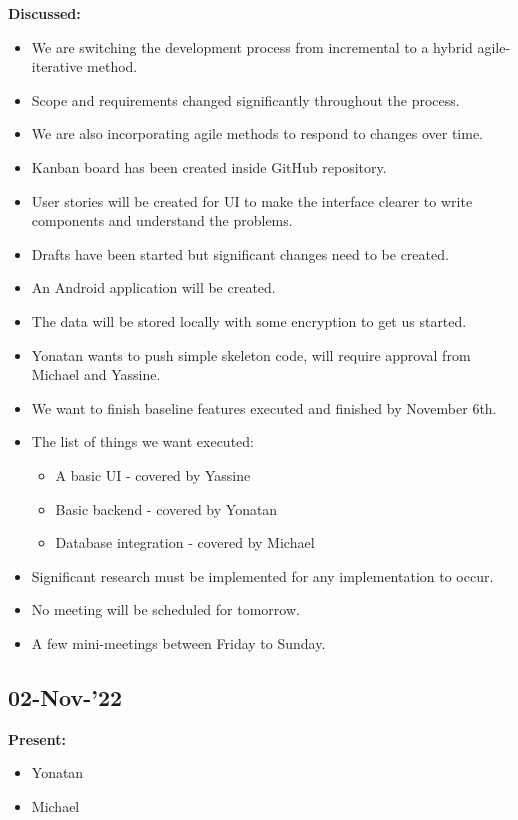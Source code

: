 \documentclass[11pt]{article}
\begin{document}
    \textbf{Discussed:}
    \begin{itemize}
        \item We are switching the development process from incremental to a hybrid agile-iterative method.
        \item Scope and requirements changed significantly throughout the process.
        \item We are also incorporating agile methods to respond to changes over time.
        \item Kanban board has been created inside GitHub repository.
        \item User stories will be created for UI to make the interface clearer to write components and understand the problems.
        \item Drafts have been started but significant changes need to be created.
        \item An Android application will be created.
        \item The data will be stored locally with some encryption to get us started.
        \item Yonatan wants to push simple skeleton code, will require approval from Michael and Yassine.
        \item We want to finish baseline features executed and finished by November 6th.
        \item The list of things we want executed:
        \begin{itemize}
            \item A basic UI - covered by Yassine
            \item Basic backend - covered by Yonatan
            \item Database integration - covered by Michael
        \end{itemize}
        \item Significant research must be implemented for any implementation to occur.
        \item No meeting will be scheduled for tomorrow.
        \item A few mini-meetings between Friday to Sunday.
    \end{itemize}

    \subsection{02-Nov-’22}\label{subsec:02-nov-22}

    \textbf{Present:}
    \begin{itemize}
        \item Yonatan
        \item Michael
    \end{itemize}
\end{document}
